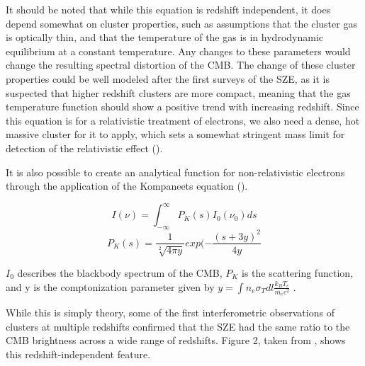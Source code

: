 \documentclass[manuscript]{aastex}
\begin{document}
It should be noted that while this equation is redshift independent, it does depend somewhat on cluster properties, such as assumptions that the cluster gas is optically thin, and that the temperature of the gas is in hydrodynamic equilibrium at a constant temperature. Any changes to these parameters would change the resulting spectral distortion of the CMB. The change of these cluster properties could be well modeled after the first surveys of the SZE, as it is suspected that higher redshift clusters are more compact, meaning that the gas temperature function should show a positive trend with increasing redshift. Since this equation is for a relativistic treatment of electrons, we also need a dense, hot massive cluster for it to apply, which sets a somewhat stringent mass limit for detection of the relativistic effect (\cite{Carlstrom2002}).

It is also possible to create an analytical function for non-relativistic electrons through the application of the Kompaneets equation (\cite{Birkinshaw1999}).

\begin{equation}\label{eq:ksze1}
I(\nu) = \int_{-\infty}^{\infty} P_{K}(s) I_{0}(\nu_{0}) ds
\end{equation}
\begin{equation}\label{eq:ksze2}
P_{K}(s) = \frac{1}{\sqrt[2]{4 \pi y}} exp(-\frac{(s + 3y)^{2}}{4y}
\end{equation}

\(I_{0}\) describes the blackbody spectrum of the CMB, \(P_{K}\) is the scattering function, and y is the comptonization parameter given by \(y = \int   n_{e}   \sigma_{T}   dl   \frac{k_{B}T_{e}}{m_{e}c^{2}}\) .

While this is simply theory, some of the first interferometric observations of clusters at multiple redshifts confirmed that the SZE had the same ratio to the CMB brightness across a wide range of redshifts. Figure 2, taken from \cite{Carlstrom2002}, shows this redshift-independent feature.
\end{document}
